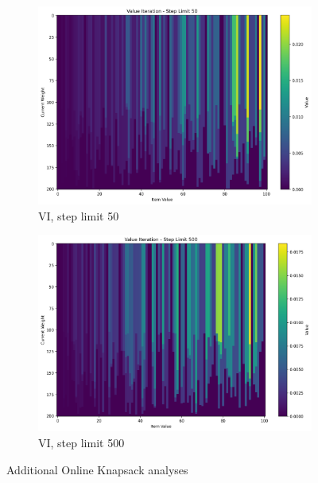 \documentclass[10pt,a4paper]{article}
\begin{document}
\begin{figure}[H]
\vspace{0.5em}
\begin{subcaptiongroup}
\begin{subfigure}{0.48\textwidth}
\includegraphics[width=\linewidth]{../Q2/part1/value_iteration_-_step_limit_50.png}
\caption{VI, step limit 50}
\end{subfigure}\hfill
\begin{subfigure}{0.48\textwidth}
\includegraphics[width=\linewidth]{../Q2/part1/value_iteration_-_step_limit_500.png}
\caption{VI, step limit 500}
\end{subfigure}
\end{subcaptiongroup}
\caption{Additional Online Knapsack analyses}
\end{figure}
\end{document}

